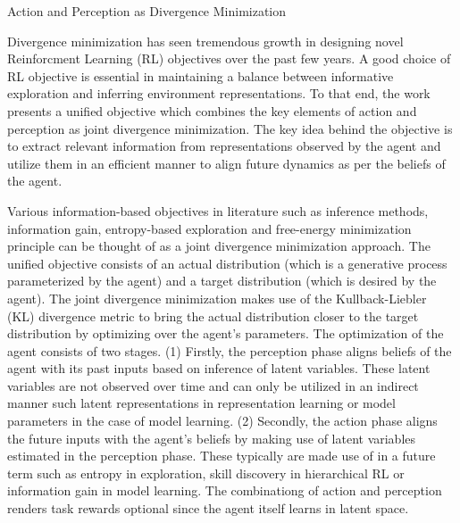 \documentclass[10.5pt,letterpaper]{article}
\begin{document}
\begin{center}
  \large{Action and Perception as Divergence Minimization}
\end{center}


Divergence minimization has seen tremendous growth in designing novel Reinforcment Learning (RL) objectives over the past few years. A good choice of RL objective is essential in maintaining a balance between informative exploration and inferring environment representations. To that end, the work presents a unified objective which combines the key elements of action and perception as joint divergence minimization. The key idea behind the objective is to extract relevant information from representations observed by the agent and utilize them in an efficient manner to align future dynamics as per the beliefs of the agent.

Various information-based objectives in literature such as inference methods, information gain, entropy-based exploration and free-energy minimization principle can be thought of as a joint divergence minimization approach. The unified objective consists of an actual distribution (which is a generative process parameterized by the agent) and a target distribution (which is desired by the agent). The joint divergence minimization makes use of the Kullback-Liebler (KL) divergence metric to bring the actual distribution closer to the target distribution by optimizing over the agent's parameters. The optimization of the agent consists of two stages. (1) Firstly, the perception phase aligns beliefs of the agent with its past inputs based on inference of latent variables. These latent variables are not observed over time and can only be utilized in an indirect manner such latent representations in representation learning or model parameters in the case of model learning. (2) Secondly, the action phase aligns the future inputs with the agent's beliefs by making use of latent variables estimated in the perception phase. These typically are made use of in a future term such as entropy in exploration, skill discovery in hierarchical RL or information gain in model learning. The combinationg of action and perception renders task rewards optional since the agent itself learns in latent space.
\end{document}
